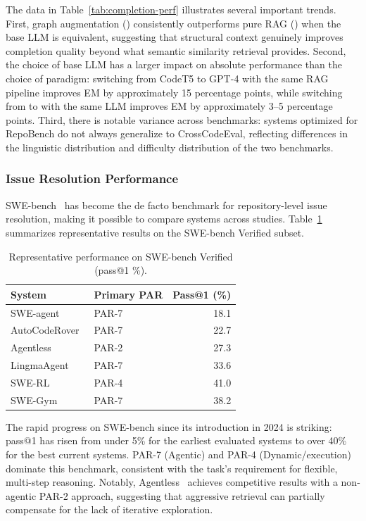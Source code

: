 The data in Table~\ref{tab:completion-perf} illustrates several important trends. First, graph
augmentation () consistently outperforms pure RAG () when the base LLM is
equivalent, suggesting that structural context genuinely improves completion quality beyond
what semantic similarity retrieval provides. Second, the choice of base LLM has a larger
impact on absolute performance than the choice of paradigm: switching from CodeT5 to GPT-4
with the same RAG pipeline improves EM by approximately 15 percentage points, while switching
from  to  with the same LLM improves EM by approximately 3--5 percentage
points. Third, there is notable variance across benchmarks: systems optimized for RepoBench
do not always generalize to CrossCodeEval, reflecting differences in the linguistic distribution
and difficulty distribution of the two benchmarks.

\subsubsection{Issue Resolution Performance}

SWE-bench~\cite{jimenez2024swebench} has become the de facto benchmark for repository-level
issue resolution, making it possible to compare systems across studies. Table~\ref{tab:swebench-perf}
summarizes representative results on the SWE-bench Verified subset.

\begin{table}[h]
\caption{Representative performance on SWE-bench Verified (pass@1 \%).}
\label{tab:swebench-perf}
\small
\begin{tabular}{llr}
\toprule
\textbf{System} & \textbf{Primary PAR} & \textbf{Pass@1 (\%)} \\
\midrule
SWE-agent~\cite{yang2024sweagent}           & PAR-7 & 18.1 \\
AutoCodeRover~\cite{zhang2024autocoderover} & PAR-7 & 22.7 \\
Agentless~\cite{xia2025demystifying}        & PAR-2 & 27.3 \\
LingmaAgent~\cite{ma2025lingma}             & PAR-7 & 33.6 \\
SWE-RL~\cite{wei2025swerl}                  & PAR-4 & 41.0 \\
SWE-Gym~\cite{pan2025training}              & PAR-7 & 38.2 \\
\bottomrule
\end{tabular}
\end{table}

The rapid progress on SWE-bench since its introduction in 2024 is striking: pass@1 has risen
from under 5\% for the earliest evaluated systems to over 40\% for the best current systems.
PAR-7 (Agentic) and PAR-4 (Dynamic/execution) dominate this benchmark, consistent with the
task's requirement for flexible, multi-step reasoning. Notably, Agentless~\cite{xia2025demystifying}
achieves competitive results with a non-agentic PAR-2 approach, suggesting that aggressive
retrieval can partially compensate for the lack of iterative exploration.

